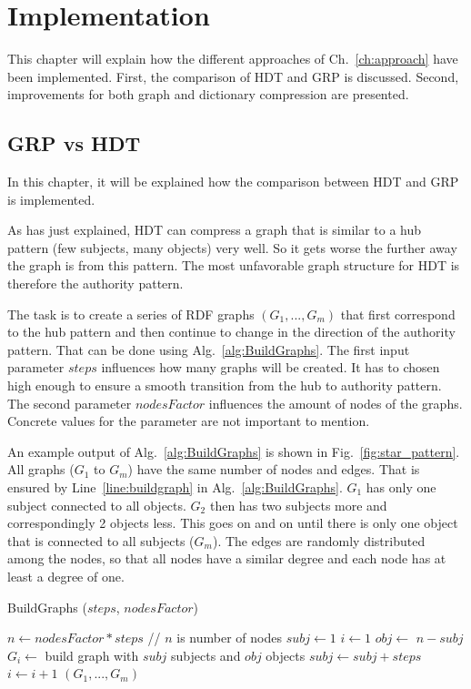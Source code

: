 \chapter{Implementation}\label{ch:implementation}

This chapter will explain how the different approaches of Ch.~\ref{ch:approach} have been implemented. First, the comparison of HDT and GRP is discussed. Second, improvements for both graph and dictionary compression are presented.

\section{GRP vs HDT}\label{sec:implementationGRPvsHDT}
In this chapter, it will be explained how the comparison between HDT and GRP is implemented.

As has just explained, HDT can compress a graph that is similar to a hub pattern (few subjects, many objects) very well. So it gets worse the further away the graph is from this pattern. The most unfavorable graph structure for HDT is therefore the authority pattern.

The task is to create a series of RDF graphs $(G_1,...,G_m)$ that first correspond to the hub pattern and then continue to change in the direction of the authority pattern. That can be done using Alg.~\ref{alg:BuildGraphs}. The first input parameter $steps$ influences how many graphs will be created. It has to chosen high enough to ensure a smooth transition from the hub to authority pattern. The second parameter $nodesFactor$ influences the amount of nodes of the graphs. Concrete values for the parameter are not important to mention.

An example output of Alg.~\ref{alg:BuildGraphs} is shown in Fig.~\ref{fig:star_pattern}. All graphs ($G_1$ to $G_m$) have the same number of nodes and edges. That is ensured by Line~\ref{line:buildgraph} in Alg.~\ref{alg:BuildGraphs}. $G_1$ has only one subject connected to all objects. $G_2$ then has two subjects more and correspondingly 2 objects less. This goes on and on until there is only one object that is connected to all subjects ($G_m$). The edges are randomly distributed among the nodes, so that all nodes have a similar degree and each node has at least a degree of one.

\begin{algorithm}
	\caption{BuildGraphs ($steps$, $ nodesFactor$)}\label{alg:BuildGraphs}
	\begin{algorithmic}[1]
	\State $n \leftarrow nodesFactor*steps$ // $n$ is number of nodes
	\State $subj \leftarrow 1$
	\State $i \leftarrow 1$
		\State $obj \leftarrow$ $n-subj$ 
		\State $G_i \leftarrow$ build graph with $subj$ subjects and $obj$ objects\label{line:buildgraph}
		\State  $subj\leftarrow subj+steps$
		\State  $i\leftarrow i+1$
	\EndWhile
	\State \Return $(G_1,...,G_m)$
	\end{algorithmic}
\end{algorithm}

